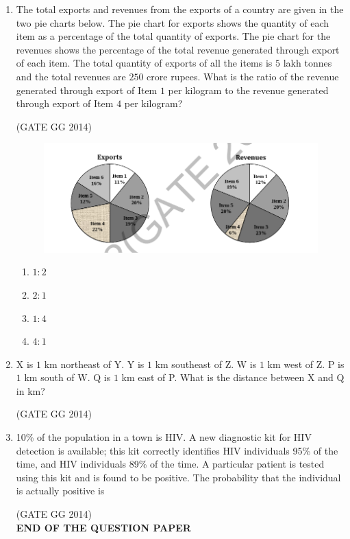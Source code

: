 \documentclass[journal]{IEEEtran}
\begin{document}
\begin{enumerate}[start=1]
\item The total exports and revenues from the exports of a country are given in the two pie charts below. The pie chart for exports shows the quantity of each item as a percentage of the total quantity of exports. The pie chart for the revenues shows the percentage of the total revenue generated through export of each item. The total quantity of exports of all the items is $5$ lakh tonnes and the total revenues are $250$ crore rupees. What is the ratio of the revenue generated through export of Item $1$ per kilogram to the revenue generated through export of Item $4$ per kilogram?

\hfill{(GATE GG 2014)}
\begin{figure}[H]
    \centering
    \includegraphics[width=0.5\columnwidth]{figs/01.png} 
    \caption{}
    \label{fig:48}
\end{figure}
\begin{enumerate}
    \item $1:2$
    \item $2:1$
    \item $1:4$
    \item $4:1$
\end{enumerate}

\item X is $1$ km northeast of Y. Y is $1$ km southeast of Z. W is $1$ km west of Z. P is $1$ km south of W. Q is $1$ km east of P. What is the distance between X and Q in km?

\hfill{(GATE GG 2014)}
\begin{enumerate}
\end{enumerate}

\item 10\% of the population in a town is HIV. A new diagnostic kit for HIV detection is available; this kit correctly identifies HIV individuals 95\% of the time, and HIV individuals 89\% of the time. A particular patient is tested using this kit and is found to be positive. The probability that the individual is actually positive is \makebox[2cm]{\hrulefill}

\hfill{(GATE GG 2014)}\\
\vspace{0.8cm}
\hspace*{4cm}\textbf{END OF THE  QUESTION PAPER }
\end{enumerate}
\end{document}
